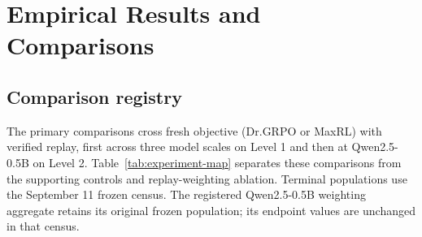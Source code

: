 \documentclass{article}
\newcommand{\1}{\mathbf 1}
\theoremstyle{remark}
\theoremstyle{definition}
\theoremstyle{plain}
\begin{document}
\section{Empirical Results and Comparisons}
\label{app:supporting}
\label{app:aligned-xmode}

\subsection{Comparison registry}
\label{app:program-registry}

The primary comparisons cross fresh objective (Dr.GRPO or MaxRL) with
verified replay, first across three model scales on Level 1 and then at
Qwen2.5-0.5B on Level 2. Table~\ref{tab:experiment-map} separates these
comparisons from the supporting controls and replay-weighting ablation.
Terminal populations use the September 11 frozen census. The registered
Qwen2.5-0.5B weighting aggregate retains its original frozen population;
its endpoint values are unchanged in that census.
\end{document}
